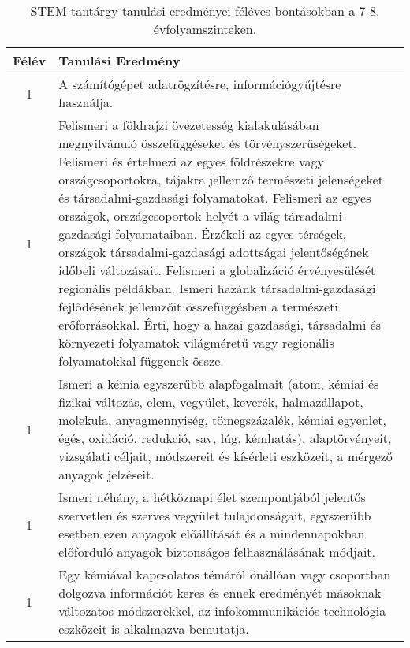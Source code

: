        
           \begin{longtable}{c | p{12cm} }
            \caption[STEM 7-8.]{STEM tantárgy tanulási eredményei féléves bontásokban a 7-8. évfolyamszinteken. }  \\

            \textbf{Félév} & \textbf{Tanulási Eredmény} \\
            \hline
            \endhead
                                
                                      
                                
                                          1 &  A számítógépet adatrögzítésre, információgyűjtésre használja. \\ \hline
                                          1 &  Felismeri a földrajzi övezetesség kialakulásában megnyilvánuló összefüggéseket és törvényszerűségeket. Felismeri és értelmezi az egyes földrészekre vagy országcsoportokra, tájakra jellemző természeti jelenségeket és  társadalmi-gazdasági folyamatokat. Felismeri az egyes országok, országcsoportok helyét a világ társadalmi-gazdasági folyamataiban. Érzékeli az egyes térségek, országok társadalmi-gazdasági adottságai jelentőségének időbeli változásait. Felismeri a globalizáció érvényesülését regionális példákban. Ismeri hazánk társadalmi-gazdasági fejlődésének jellemzőit összefüggésben a természeti erőforrásokkal. Érti, hogy a hazai gazdasági, társadalmi és környezeti folyamatok világméretű vagy regionális folyamatokkal függenek össze. \\ \hline
                                          1 &  Ismeri a kémia egyszerűbb alapfogalmait (atom, kémiai és fizikai változás, elem, vegyület, keverék, halmazállapot, molekula, anyagmennyiség, tömegszázalék, kémiai egyenlet, égés, oxidáció, redukció, sav, lúg, kémhatás), alaptörvényeit, vizsgálati céljait, módszereit és kísérleti eszközeit, a mérgező anyagok jelzéseit. \\ \hline
                                          1 &  Ismeri néhány, a hétköznapi élet szempontjából jelentős szervetlen és szerves vegyület tulajdonságait, egyszerűbb esetben ezen anyagok előállítását és a mindennapokban előforduló anyagok biztonságos felhasználásának módjait. \\ \hline
                                          1 &  Egy kémiával kapcsolatos témáról önállóan vagy csoportban dolgozva információt keres és ennek eredményét másoknak változatos módszerekkel, az infokommunikációs technológia eszközeit is alkalmazva bemutatja. \\ \hline

\end{longtable}
